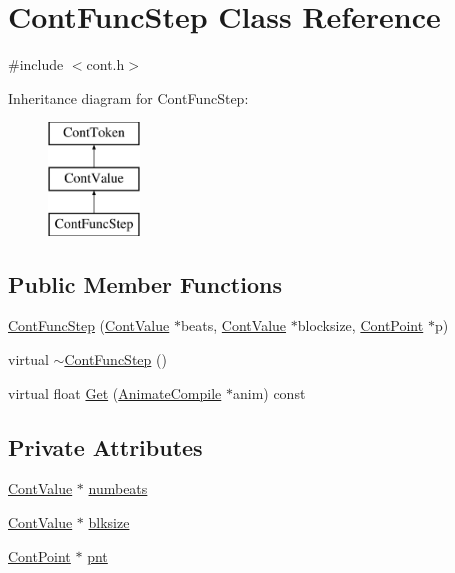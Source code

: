\hypertarget{a00058}{\section{Cont\-Func\-Step Class Reference}
\label{a00058}
}


{\ttfamily \#include $<$cont.\-h$>$}

Inheritance diagram for Cont\-Func\-Step\-:\begin{figure}[H]
\begin{center}
\leavevmode
\includegraphics[height=3.000000cm]{a00058}
\end{center}
\end{figure}
\subsection*{Public Member Functions}
\begin{DoxyCompactItemize}
\item 
\hyperlink{a00058_aadda36c5a5639224ce73bc88d9a67b77}{Cont\-Func\-Step} (\hyperlink{a00086}{Cont\-Value} $\ast$beats, \hyperlink{a00086}{Cont\-Value} $\ast$blocksize, \hyperlink{a00062}{Cont\-Point} $\ast$p)
\item 
virtual \hyperlink{a00058_a994c24500c38f1c1cb9426313a7270e8}{$\sim$\-Cont\-Func\-Step} ()
\item 
virtual float \hyperlink{a00058_a77931d7840c6fa3a948bf40b16633598}{Get} (\hyperlink{a00007}{Animate\-Compile} $\ast$anim) const 
\end{DoxyCompactItemize}
\subsection*{Private Attributes}
\begin{DoxyCompactItemize}
\item 
\hyperlink{a00086}{Cont\-Value} $\ast$ \hyperlink{a00058_a5695048b68de893beacc7ade45d483a6}{numbeats}
\item 
\hyperlink{a00086}{Cont\-Value} $\ast$ \hyperlink{a00058_a5c9588cbcc73f026ad1f393717b23dd7}{blksize}
\item 
\hyperlink{a00062}{Cont\-Point} $\ast$ \hyperlink{a00058_ad5525f949ad5b9c94ce3d242f44fef54}{pnt}
\end{DoxyCompactItemize}
